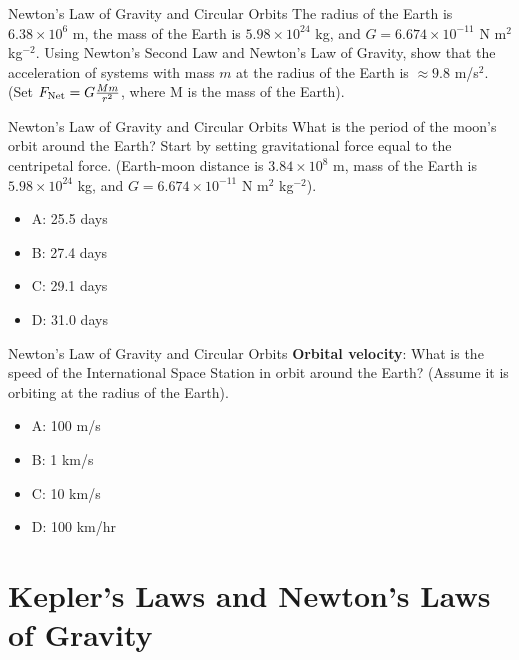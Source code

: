 \documentclass{beamer}
\begin{document}
\begin{frame}{Newton's Law of Gravity and Circular Orbits}
The radius of the Earth is $6.38\times 10^6$ m, the mass of the Earth is $5.98 \times 10^24$ kg, and $G = 6.674\times 10^{-11}$ N m$^2$ kg$^{-2}$.  Using Newton's Second Law and Newton's Law of Gravity, show that the acceleration of systems with mass $m$ at the radius of the Earth is $\approx 9.8$ m/s$^2$.\\
\vspace{0.2cm}
(Set $F_{\rm Net} = G\frac{Mm}{r^2}$, where M is the mass of the Earth).
\end{frame}

\begin{frame}{Newton's Law of Gravity and Circular Orbits}
What is the period of the moon's orbit around the Earth?  Start by setting gravitational force equal to the centripetal force.  (Earth-moon distance is $3.84\times 10^8$ m, mass of the Earth is $5.98 \times 10^{24}$ kg, and $G = 6.674\times 10^{-11}$ N m$^2$ kg$^{-2}$).
\begin{itemize}
\item A: 25.5 days
\item B: 27.4 days
\item C: 29.1 days
\item D: 31.0 days
\end{itemize}
\end{frame}

\begin{frame}{Newton's Law of Gravity and Circular Orbits}
\textbf{Orbital velocity}: What is the speed of the International Space Station in orbit around the Earth?  (Assume it is orbiting at the radius of the Earth).
\begin{itemize}
\item A: 100 m/s
\item B: 1 km/s
\item C: 10 km/s
\item D: 100 km/hr
\end{itemize}
\end{frame}

\section{Kepler's Laws and Newton's Laws of Gravity}
\end{document}
